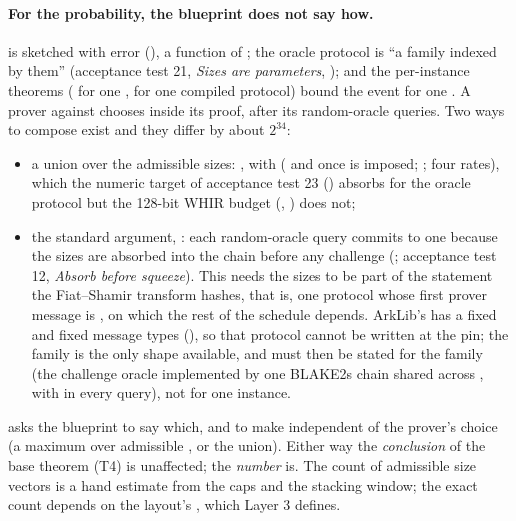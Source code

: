\paragraph{For the probability, the blueprint does not say how.}  is
sketched with error  (), a function of ; the oracle
protocol is \enquote{a family indexed by them} (acceptance test 21, \emph{Sizes are parameters},
); and the per-instance theorems ( for one
,  for one compiled protocol) bound the event for one .
A prover against  chooses  inside its proof, after its random-oracle
queries. Two ways to compose exist and they differ by about $2^{34}$:
\begin{itemize}
\item a union over the admissible sizes:
  , with
   ( and 
  once  is imposed; ; four rates), which the numeric target of
  acceptance test 23 () absorbs for the oracle protocol but the 128-bit WHIR budget
  (, ) does not;
\item the standard argument, : each random-oracle query commits to one
   because the sizes are absorbed into the chain before any challenge
  (; acceptance test 12, \emph{Absorb before squeeze}). This needs the
  sizes to be part of the statement the Fiat--Shamir transform hashes, that is, one protocol
  whose first prover message is , on which the rest of the schedule depends. ArkLib's
   has a fixed  and fixed message types
  (), so that protocol cannot be written at the pin; the family is
  the only shape available, and  must then be stated for the family
  (the challenge oracle implemented by one BLAKE2s chain shared across , with  in
  every query), not for one instance.
\end{itemize}
 asks the blueprint to say which, and to make 
independent of the prover's choice (a maximum over admissible , or the union). Either way
the \emph{conclusion} of the base theorem (T4) is unaffected; the \emph{number} is. The count of
admissible size vectors is a hand estimate from the caps and the stacking window; the exact count
depends on the layout's , which Layer 3 defines.

